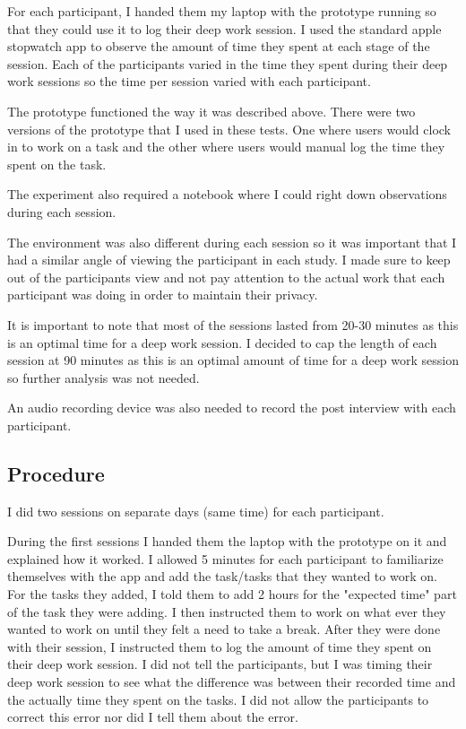 \documentclass[sigconf]{acmart}
\begin{document}
For each participant, I handed them my laptop with the prototype running so that they could use it to log their deep work session. I used the standard apple stopwatch app to observe the amount of time they spent at each stage of the session. Each of the participants varied in the time they spent during their deep work sessions so the time per session varied with each participant. 

The prototype functioned the way it was described above. There were two versions of the prototype that I used in these tests. One where users would clock in to work on a task and the other where users would manual log the time they spent on the task. 

The experiment also required a notebook where I could right down observations during each session.

The environment was also different during each session so it was important that I had a similar angle of viewing the participant in each study. I made sure to keep out of the participants view and not pay attention to the actual work that each participant was doing in order to maintain their privacy. 

It is important to note that most of the sessions lasted from 20-30 minutes as this is an optimal time for a deep work session. I decided to cap the length of each session at 90 minutes as this is an optimal amount of time for a deep work session so further analysis was not needed. 

An audio recording device was also needed to record the post interview with each participant.

\subsection{Procedure}
I did two sessions on separate days (same time) for each participant. 

During the first sessions I handed them the laptop with the prototype on it and explained how it worked. I allowed 5 minutes for each participant to familiarize themselves with the app and add the task/tasks that they wanted to work on. For the tasks they added, I told them to add 2 hours for the "expected time" part of the task they were adding. I then instructed them to work on what ever they wanted to work on until they felt a need to take a break. After they were done with their session, I instructed them to log the amount of time they spent on their deep work session. I did not tell the participants, but I was timing their deep work session to see what the difference was between their recorded time and the actually time they spent on the tasks. I did not allow the participants to correct this error nor did I tell them about the error. 
\end{document}
